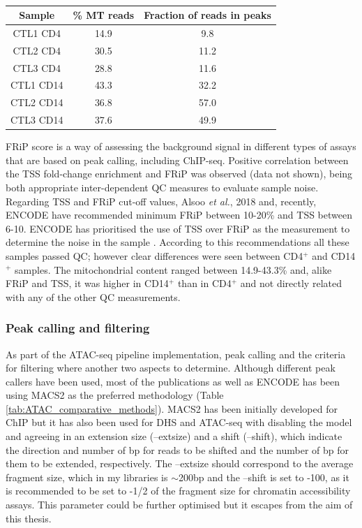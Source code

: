 \begin{table}[htbp]
\centering
\begin{tabular}{@{} c c c}
\toprule
\textbf{Sample} & \textbf{\% MT reads} & \textbf{Fraction of reads in peaks} \\
\midrule
\midrule
CTL1 CD4 & 14.9 & 9.8 \\
CTL2 CD4 & 30.5 & 11.2 \\
CTL3 CD4 & 28.8 & 11.6 \\
CTL1 CD14 & 43.3 & 32.2 \\
CTL2 CD14 & 36.8 & 57.0 \\
CTL3 CD14 & 37.6 & 49.9 \\
\bottomrule
\end{tabular}
\medskip %
\caption[ATAC-seq percentage of MT reads and fraction of reads in called peaks]{\textbf{}}
\label{tab:ATAC_MT_fraction_reads_in_peaks}
\end{table}
\bigskip %


FRiP score is a way of assessing the background signal in different types of assays that are based on peak calling, including ChIP-seq. Positive correlation between the TSS fold-change enrichment and FRiP was observed (data not shown), being both appropriate inter-dependent QC measures to evaluate sample noise. Regarding TSS and FRiP cut-off values, Alsoo \textit{et al.}, 2018 and, recently, ENCODE have recommended minimum FRiP between 10-20\% and TSS between 6-10. ENCODE has prioritised the use of TSS over FRiP as the measurement to determine the noise in the sample \parencite{ENCODE}. According to this recommendations all these samples passed QC; however clear differences were seen between CD4$^+$ and CD14$^+$ samples. The mitochondrial content ranged between 14.9-43.3\% and, alike FRiP and TSS, it was higher in CD14$^+$ than in CD4$^+$ and not directly related with any of the other QC measurements.


	

\subsubsection{Peak calling and filtering}
As part of the ATAC-seq pipeline implementation, peak calling and the criteria for filtering where another two aspects to determine.
Although different peak callers have been used, most of the publications as well as ENCODE has been using MACS2 as the preferred methodology (Table \ref{tab:ATAC_comparative_methods}). MACS2 has been initially developed for ChIP but it has also been used for DHS and ATAC-seq with disabling the model and agreeing in an extension size (--extsize) and a shift (--shift), which indicate the direction and number of bp for reads to be shifted and the number of bp for them to be extended, respectively. The --extsize should correspond to the average fragment size, which in my libraries is $\sim$200bp and the --shift is set to -100, as it is recommended to be set to -1/2 of the fragment size for chromatin accessibility assays. This parameter could be further optimised but it escapes from the aim of this thesis.

